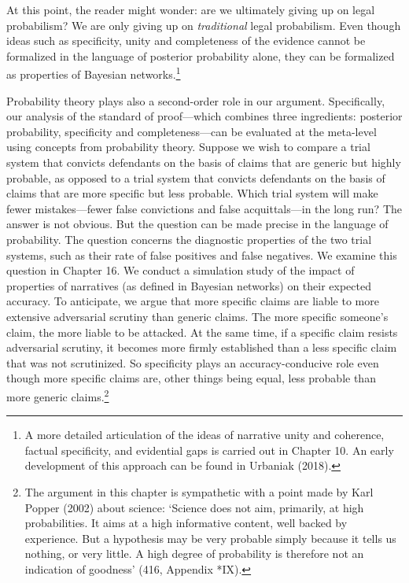 \documentclass[
  10pt,
  dvipsnames,enabledeprecatedfontcommands]{scrartcl}
\begin{document}
\noindent  At this point, the reader might wonder: are we ultimately
giving up on legal probabilism? We are only giving up on
\emph{traditional} legal probabilism. Even though ideas such as
specificity, unity and completeness of the evidence cannot be formalized
in the language of posterior probability alone, they can be formalized
as properties of Bayesian networks.\footnote{A more detailed
  articulation of the ideas of narrative unity and coherence, factual
  specificity, and evidential gaps is carried out in Chapter 10. An
  early development of this approach can be found in Urbaniak (2018).}

Probability theory plays also a second-order role in our argument.
Specifically, our analysis of the standard of proof---which combines
three ingredients: posterior probability, specificity and
completeness---can be evaluated at the meta-level using concepts from
probability theory. Suppose we wish to compare a trial system that
convicts defendants on the basis of claims that are generic but highly
probable, as opposed to a trial system that convicts defendants on the
basis of claims that are more specific but less probable. Which trial
system will make fewer mistakes---fewer false convictions and false
acquittals---in the long run? The answer is not obvious. But the
question can be made precise in the language of probability. The
question concerns the diagnostic properties of the two trial systems,
such as their rate of false positives and false negatives. We examine
this question in Chapter 16. We conduct a simulation study of the impact
of properties of narratives (as defined in Bayesian networks) on their
expected accuracy.  To anticipate, we
argue that more specific claims are liable to more extensive adversarial
scrutiny than generic claims. The more specific someone's claim, the
more liable to be attacked. At the same time, if a specific claim
resists adversarial scrutiny, it becomes more firmly established than a
less specific claim that was not scrutinized. So specificity plays an
accuracy-conducive role even though more specific claims are, other
things being equal, less probable than more generic claims.\footnote{The
  argument in this chapter is sympathetic with a point made by Karl
  Popper (2002) about science: `Science does not aim, primarily, at high
  probabilities. It aims at a high informative content, well backed by
  experience. But a hypothesis may be very probable simply because it
  tells us nothing, or very little. A high degree of probability is
  therefore not an indication of goodness' (416, Appendix *IX).}
\end{document}
